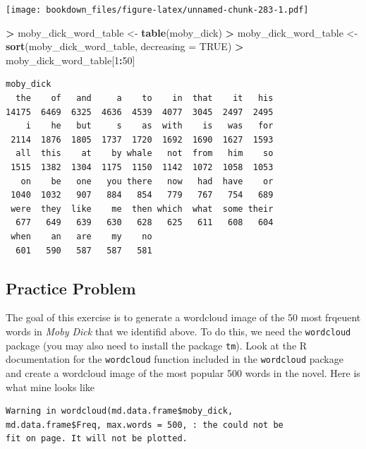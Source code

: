 \documentclass[]{krantz}
\makeatletter
\newenvironment{Shaded}{\begin{snugshade}}{\end{snugshade}}
\newcommand{\KeywordTok}[1]{\textcolor[rgb]{0.27,0.27,0.27}{\textbf{#1}}}
\newcommand{\DataTypeTok}[1]{\textcolor[rgb]{0.27,0.27,0.27}{#1}}
\newcommand{\DecValTok}[1]{\textcolor[rgb]{0.06,0.06,0.06}{#1}}
\newcommand{\StringTok}[1]{\textcolor[rgb]{0.5,0.5,0.5}{#1}}
\newcommand{\OtherTok}[1]{\textcolor[rgb]{0.37,0.37,0.37}{#1}}
\newcommand{\OperatorTok}[1]{\textcolor[rgb]{0.43,0.43,0.43}{\textbf{#1}}}
\newcommand{\NormalTok}[1]{#1}
\newenvironment{kframe}{%
\medskip{}
\setlength{\fboxsep}{.8em}
 \def\at@end@of@kframe{}%
 \ifinner\ifhmode%
  \def\at@end@of@kframe{\end{minipage}}%
  \begin{minipage}{\columnwidth}%
 \fi\fi%
 \def\FrameCommand##1{\hskip\@totalleftmargin \hskip-\fboxsep
 \colorbox{shadecolor}{##1}\hskip-\fboxsep
     \hskip-\linewidth \hskip-\@totalleftmargin \hskip\columnwidth}%
 \MakeFramed {\advance\hsize-\width
   \@totalleftmargin\z@ \linewidth\hsize
   \@setminipage}}%
 {\par\unskip\endMakeFramed%
 \at@end@of@kframe}
\renewenvironment{Shaded}{\begin{kframe}}{\end{kframe}}
\makeatother
\begin{document}
\texttt{[image: bookdown\_files/figure-latex/unnamed-chunk-283-1.pdf]}

\begin{Shaded}
\begin{Highlighting}[]
\OperatorTok{>}\StringTok{ }\NormalTok{moby_dick_word_table <-}\StringTok{ }\KeywordTok{table}\NormalTok{(moby_dick)}
\OperatorTok{>}\StringTok{ }\NormalTok{moby_dick_word_table <-}\StringTok{ }\KeywordTok{sort}\NormalTok{(moby_dick_word_table, }\DataTypeTok{decreasing =} \OtherTok{TRUE}\NormalTok{)}
\OperatorTok{>}\StringTok{ }\NormalTok{moby_dick_word_table[}\DecValTok{1}\OperatorTok{:}\DecValTok{50}\NormalTok{]}
\end{Highlighting}
\end{Shaded}

\begin{verbatim}
moby_dick
  the    of   and     a    to    in  that    it   his 
14175  6469  6325  4636  4539  4077  3045  2497  2495 
    i    he   but     s    as  with    is   was   for 
 2114  1876  1805  1737  1720  1692  1690  1627  1593 
  all  this    at    by whale   not  from   him    so 
 1515  1382  1304  1175  1150  1142  1072  1058  1053 
   on    be   one   you there   now   had  have    or 
 1040  1032   907   884   854   779   767   754   689 
 were  they  like    me  then which  what  some their 
  677   649   639   630   628   625   611   608   604 
 when    an   are    my    no 
  601   590   587   587   581 
\end{verbatim}

\subsection{Practice Problem}\label{practice-problem-15}

The goal of this exercise is to generate a wordcloud image of the 50
most frqeuent words in \emph{Moby Dick} that we identifid above. To do
this, we need the \texttt{wordcloud} package (you may also need to
install the package \texttt{tm}). Look at the R documentation for the
\texttt{wordcloud} function included in the \texttt{wordcloud} package
and create a wordcloud image of the most popular 500 words in the novel.
Here is what mine looks like

\begin{verbatim}
Warning in wordcloud(md.data.frame$moby_dick,
md.data.frame$Freq, max.words = 500, : the could not be
fit on page. It will not be plotted.
\end{verbatim}
\end{document}

